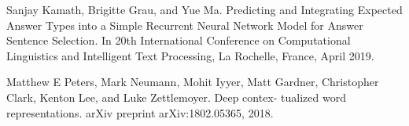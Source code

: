 \documentclass{llncs}
\begin{document}
\begin{thebibliography}{}
 Sanjay Kamath, Brigitte Grau, and Yue Ma. Predicting and Integrating Expected Answer Types into a Simple Recurrent Neural Network Model for Answer Sentence Selection. In 20th International Conference on Computational Linguistics and Intelligent Text Processing, La Rochelle, France, April 2019. 

  Matthew E Peters, Mark Neumann, Mohit Iyyer, Matt Gardner,
Christopher Clark, Kenton Lee, and Luke Zettlemoyer. Deep contex-
tualized word representations. arXiv preprint arXiv:1802.05365, 2018.





\end{thebibliography}
\clearpage
\clearpage
%
\end{document}
